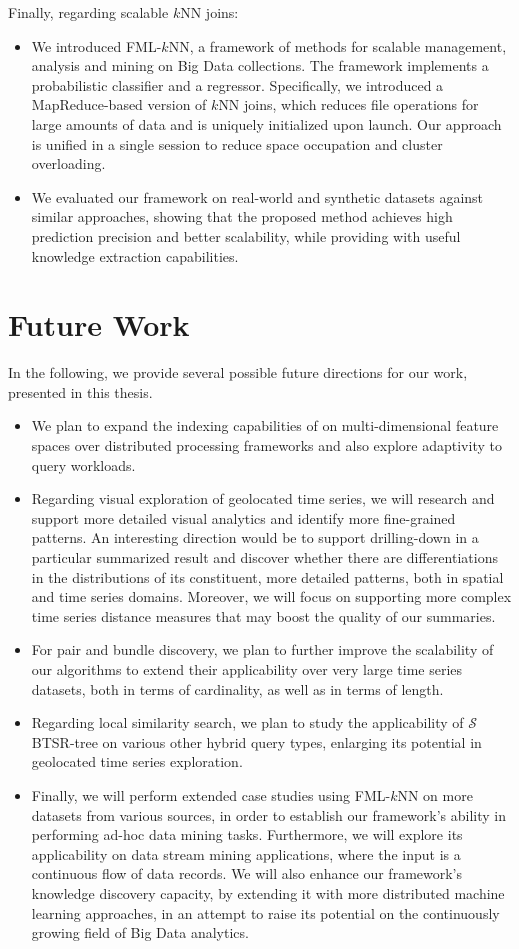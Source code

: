 Finally, regarding scalable $k$NN joins:
\begin{itemize}
	\item We introduced FML-$k$NN, a framework of methods for scalable management, analysis and mining on Big Data collections. The framework implements a probabilistic classifier and a regressor. Specifically, we introduced a MapReduce-based version of $k$NN joins, which reduces file operations for large amounts of data and is uniquely initialized upon launch. Our approach is unified in a single session to reduce space occupation and cluster overloading.
	\item We evaluated our framework on real-world and synthetic datasets against similar approaches, showing that the proposed method achieves high prediction precision and better scalability, while providing with useful knowledge extraction capabilities.
\end{itemize}

\section{Future Work}
\label{sec:future}
In the following, we provide several possible future directions for our work, presented in this thesis.

\begin{itemize}
	\item We plan to expand the indexing capabilities of \btsr on multi-dimensional feature spaces over distributed processing frameworks and also explore adaptivity to query workloads.
	\item Regarding visual exploration of geolocated time series, we will research and support more detailed visual analytics and identify more fine-grained patterns. An interesting direction would be to support drilling-down in a particular summarized result and discover whether there are differentiations in the distributions of its constituent, more detailed patterns, both in spatial and time series domains. Moreover, we will focus on supporting more complex time series distance measures that may boost the quality of our summaries.
	\item For pair and bundle discovery, we plan to further improve the scalability of our algorithms to extend their applicability over very large time series datasets, both in terms of cardinality, as well as in terms of length.
	\item Regarding local similarity search, we plan to study the applicability of \texorpdfstring{$\mathcal{S}$}BBTSR-tree on various other hybrid query types, enlarging its potential in geolocated time series exploration.
	\item Finally, we will perform extended case studies using FML-$k$NN on more datasets from various sources, in order to establish our framework's ability in performing ad-hoc data mining tasks. Furthermore, we will explore its applicability on data stream mining applications, where the input is a continuous flow of data records. We will also enhance our framework's knowledge discovery capacity, by extending it with more distributed machine learning approaches, in an attempt to raise its potential on the continuously growing field of Big Data analytics.
\end{itemize}